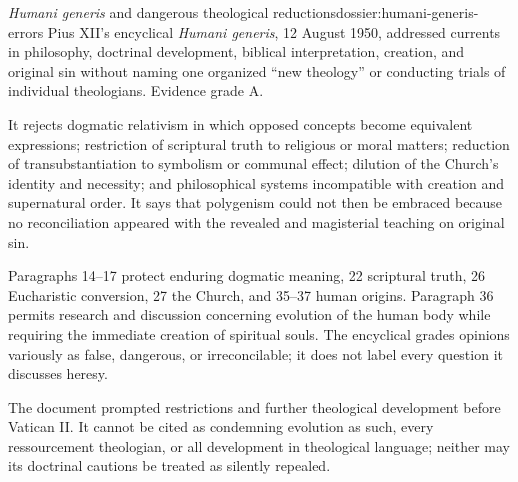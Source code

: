 \begin{heresydossier}{\emph{Humani generis} and dangerous theological reductions}{dossier:humani-generis-errors}
\objectfield Pius XII's encyclical \emph{Humani generis}, 12 August 1950, addressed currents in philosophy, doctrinal development, biblical interpretation, creation, and original sin without naming one organized ``new theology'' or conducting trials of individual theologians. Evidence grade A.

\propositionfield It rejects dogmatic relativism in which opposed concepts become equivalent expressions; restriction of scriptural truth to religious or moral matters; reduction of transubstantiation to symbolism or communal effect; dilution of the Church's identity and necessity; and philosophical systems incompatible with creation and supernatural order. It says that polygenism could not then be embraced because no reconciliation appeared with the revealed and magisterial teaching on original sin.

\responsefield Paragraphs 14--17 protect enduring dogmatic meaning, 22 scriptural truth, 26 Eucharistic conversion, 27 the Church, and 35--37 human origins. Paragraph 36 permits research and discussion concerning evolution of the human body while requiring the immediate creation of spiritual souls. The encyclical grades opinions variously as false, dangerous, or irreconcilable; it does not label every question it discusses heresy.

\aftermathfield The document prompted restrictions and further theological development before Vatican II. It cannot be cited as condemning evolution as such, every ressourcement theologian, or all development in theological language; neither may its doctrinal cautions be treated as silently repealed.
\end{heresydossier}

